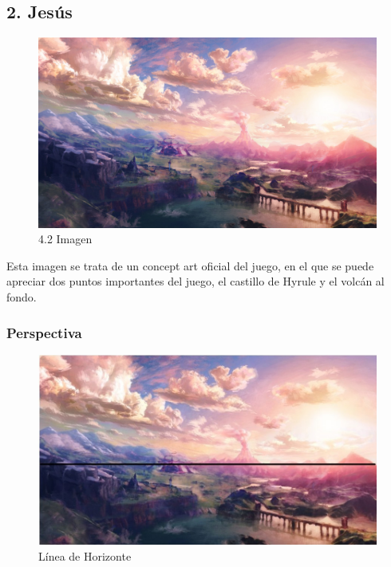 \documentclass[12pt]{article}
\begin{document}

    \subsection{2. Jesús}

        \begin{figure}[H]
          \centering
          \includegraphics[width=\textwidth]{images/Concepts/2_concept_art.jpg}
          \caption{\small{4.2 Imagen}}
        \end{figure}
        
        Esta imagen se trata de un concept art oficial del juego, en el que se puede apreciar dos puntos importantes del juego, el castillo de Hyrule y el volcán al fondo. 

        \subsubsection{Perspectiva}
        \begin{figure}[H]
          \centering
          \includegraphics[width=\textwidth]{Jesus/Seccion2/Group 4.JPEG}
          \caption{Línea de Horizonte}
        \end{figure}
\end{document}
